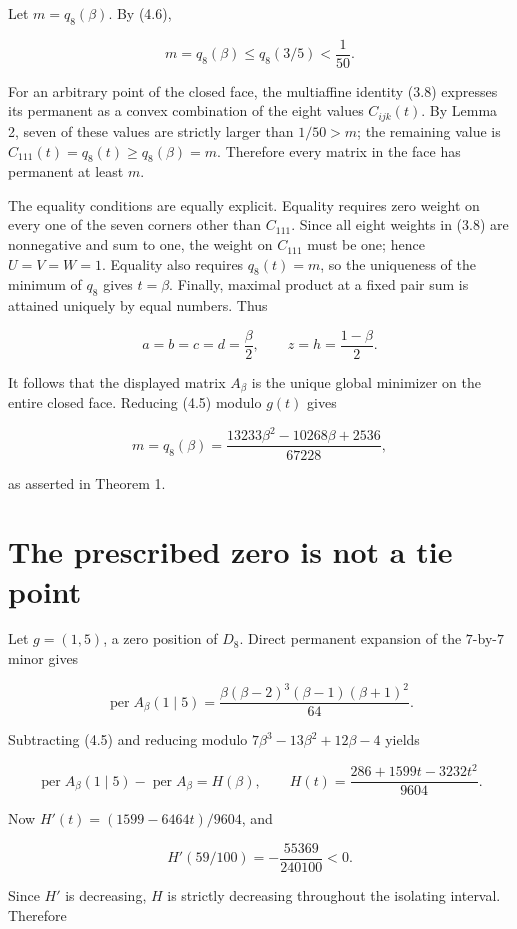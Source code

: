 \documentclass[11pt]{article}
\theoremstyle{definition}
\begin{document}
Let \(m=q_8(\beta)\). By (4.6),

\[
m=q_8(\beta)\le q_8(3/5)<\frac1{50}.
\]

For an arbitrary point of the closed face, the multiaffine identity (3.8)
expresses its permanent as a convex combination of the eight values
\(C_{ijk}(t)\). By Lemma 2, seven of these values are strictly larger than
\(1/50>m\); the remaining value is
\(C_{111}(t)=q_8(t)\ge q_8(\beta)=m\). Therefore every matrix in the face has
permanent at least \(m\).

The equality conditions are equally explicit. Equality requires zero weight
on every one of the seven corners other than \(C_{111}\). Since all eight
weights in (3.8) are nonnegative and sum to one, the weight on \(C_{111}\)
must be one; hence \(U=V=W=1\). Equality also requires \(q_8(t)=m\), so the
uniqueness of the minimum of \(q_8\) gives \(t=\beta\). Finally, maximal
product at a fixed pair sum is attained uniquely by equal numbers. Thus

\[
a=b=c=d=\frac\beta2,
\qquad z=h=\frac{1-\beta}{2}.                            \tag{4.9}
\]

It follows that the displayed matrix \(A_\beta\) is the unique global
minimizer on the entire closed face. Reducing (4.5) modulo \(g(t)\) gives

\[
m=q_8(\beta)
=\frac{13233\beta^2-10268\beta+2536}{67228},            \tag{4.10}
\]

as asserted in Theorem 1.

\section{The prescribed zero is not a tie point}

Let \(g=(1,5)\), a zero position of \(D_8\). Direct permanent expansion of
the \(7\)-by-\(7\) minor gives

\[
\operatorname{per}A_\beta(1\mid5)
=\frac{\beta(\beta-2)^3(\beta-1)(\beta+1)^2}{64}.       \tag{5.1}
\]

Subtracting (4.5)
and reducing modulo \(7\beta^3-13\beta^2+12\beta-4\) yields

\[
\operatorname{per}A_\beta(1\mid5)-\operatorname{per}A_\beta
=H(\beta),
\qquad
H(t)=\frac{286+1599t-3232t^2}{9604}.                    \tag{5.2}
\]

Now \(H'(t)=(1599-6464t)/9604\), and

\[
H'(59/100)=-\frac{55369}{240100}<0.
\]

Since \(H'\) is decreasing, \(H\) is strictly decreasing throughout the
isolating interval. Therefore
\end{document}
